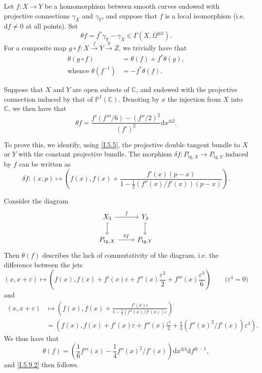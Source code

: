 \documentclass{report}
\theoremstyle{plain}
\theoremstyle{definition}
\newenvironment{env}[1]
    {\renewcommand\theinnercustomenv{#1}\innercustomenv}
    {\endinnercustomenv}
\newcommand{\PP}{\mathbb{P}}
\newcommand{\CC}{\mathbb{C}}
\newcommand{\dd}{\mathrm{d}}
\newcommand{\tg}{\mathrm{tg}}
\newcommand{\oldpage}[1]{\marginpar{\footnotesize$\Big\vert$ \textit{p.~#1}}}
\begin{document}
\begin{env}{5.9}
\label{I.5.9}
  Let $f\colon X\to Y$ be a homomorphism between smooth curves endowed with projective connections $\gamma_X$ and $\gamma_Y$, and suppose that $f$ is a local isomorphism (i.e. $\dd f\neq0$ at all points).
  Set
  \[
    \theta f = f^*\gamma_Y - \gamma_X \in \Gamma(X,\Omega^{\otimes2}).
  \]
  For a composite map $g\circ f\colon X\xrightarrow{f}Y\xrightarrow{g}Z$, we trivially have that
  \[
  \label{I.5.9.1}
    \begin{aligned}
      \theta(g\circ f) &= \theta(f) + f^*\theta(g),
    \\\mbox{whence }\theta(f^{-1}) &= -f^*\theta(f).
    \end{aligned}
  \tag{5.9.1}
  \]

  Suppose that $X$ and $Y$ are open subsets of $\CC$, and endowed with the projective connection induced by that of $\PP^1(\CC)$.
  Denoting by $x$ the injection from $X$ into $\CC$, we then have that
\oldpage{33}
  \[
  \label{I.5.9.2}
    \theta f = \frac{f'(f'''/6) - (f''/2)^2}{(f')^2} \dd x^{\otimes2}.
  \tag{5.9.2}
  \]

  To prove this, we identify, using \cref{I.5.5}, the projective double tangent bundle to $X$ or $Y$ with the constant projective bundle.
  The morphism $\delta f\colon P_{\tg,X}\to P_{\tg,Y}$ induced by $f$ can be written as
  \[
    \delta f\colon (x,p) \mapsto
    \left(
      f(x),
      f(x) + \frac{f'(x)(p-x)}{1-\frac12(f''(x)/f'(x))(p-x)}
    \right).
  \]

  Consider the diagram
  \[
    \begin{tikzcd}
      X_3 \rar["f"] \dar[hook]
      & Y_3 \dar[hook]
    \\P_{\tg,X} \rar["\delta f"]
      & P_{\tg,Y}
    \end{tikzcd}
  \]
  Then $\theta(f)$ describes the lack of commutativity of the diagram, i.e. the difference between the jets
  \[
    (x,x+\varepsilon)
    \mapsto
    \left(
      f(x),
      f(x) + f'(x)\varepsilon + f''(x)\frac{\varepsilon^2}{2} + f'''(x)\frac{\varepsilon^3}{6}
    \right)
    \qquad\mbox{($\varepsilon^4=0$)}
  \]
  and
  \[
    \begin{aligned}
      (x,x+\varepsilon)
      &\mapsto
      \left(
        f(x),
        f(x) + \frac{f'(x)\varepsilon}{1-\frac12(f''(x)/f'(x))\varepsilon}
      \right)
    \\&= \left(
        f(x),
        f(x) + f'(x)\varepsilon + f''(x)\frac{\varepsilon^2}{2} + \frac14(f''(x)^2/f'(x))\varepsilon^3
      \right).
    \end{aligned}
  \]
  We thus have that
  \[
    \theta(f) =
    \left(
      \frac16f'''(x) - \frac14f''(x)^2/f'(x)
    \right) \dd x^{\otimes3} \dd f^{\otimes-1},
  \]
  and \cref{I.5.9.2} then follows.


\end{env}
\end{document}
